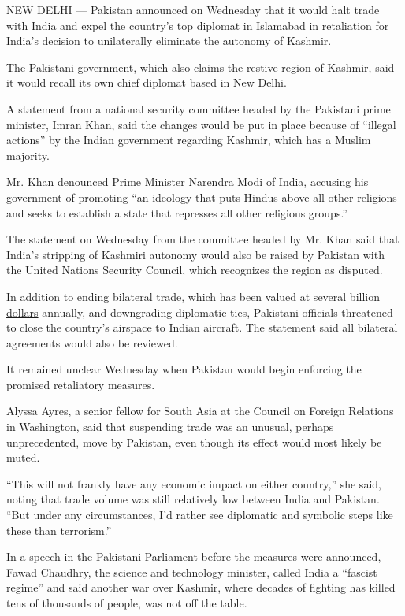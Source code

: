 NEW DELHI --- Pakistan announced on Wednesday that it would halt trade
with India and expel the country's top diplomat in Islamabad in
retaliation for India's decision to unilaterally eliminate the autonomy
of Kashmir.

The Pakistani government, which also claims the restive region of
Kashmir, said it would recall its own chief diplomat based in New Delhi.

A statement from a national security committee headed by the Pakistani
prime minister, Imran Khan, said the changes would be put in place
because of ``illegal actions'' by the Indian government regarding
Kashmir, which has a Muslim majority.

Mr. Khan denounced Prime Minister Narendra Modi of India, accusing his
government of promoting ``an ideology that puts Hindus above all other
religions and seeks to establish a state that represses all other
religious groups.''

The statement on Wednesday from the committee headed by Mr. Khan said
that India's stripping of Kashmiri autonomy would also be raised by
Pakistan with the United Nations Security Council, which recognizes the
region as disputed.

In addition to ending bilateral trade, which has been
\href{https://www.business-standard.com/article/pti-stories/indo-pak-bilateral-trade-posted-growth-despite-tensions-report-119022400294_1.html}{valued
at several billion dollars} annually, and downgrading diplomatic ties,
Pakistani officials threatened to close the country's airspace to Indian
aircraft. The statement said all bilateral agreements would also be
reviewed.

It remained unclear Wednesday when Pakistan would begin enforcing the
promised retaliatory measures.

Alyssa Ayres, a senior fellow for South Asia at the Council on Foreign
Relations in Washington, said that suspending trade was an unusual,
perhaps unprecedented, move by Pakistan, even though its effect would
most likely be muted.

``This will not frankly have any economic impact on either country,''
she said, noting that trade volume was still relatively low between
India and Pakistan. ``But under any circumstances, I'd rather see
diplomatic and symbolic steps like these than terrorism.''

In a speech in the Pakistani Parliament before the measures were
announced, Fawad Chaudhry, the science and technology minister, called
India a ``fascist regime'' and said another war over Kashmir, where
decades of fighting has killed tens of thousands of people, was not off
the table.

